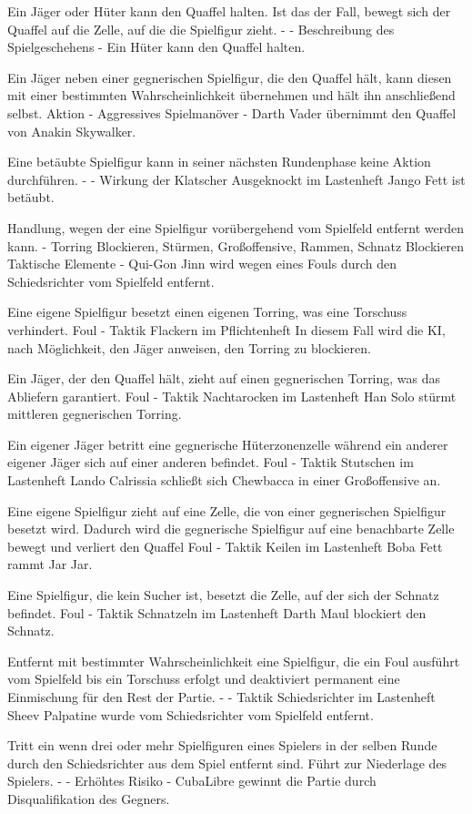 {Ein Jäger oder Hüter kann den Quaffel halten. Ist das der Fall, bewegt sich der Quaffel auf die Zelle, auf die die Spielfigur zieht.}
{-}
{-}
{Beschreibung des Spielgeschehens}
{-}
{Ein Hüter kann den Quaffel halten.}

{Ein Jäger neben einer gegnerischen Spielfigur, die den Quaffel hält, kann diesen mit einer bestimmten Wahrscheinlichkeit übernehmen und hält ihn anschließend selbst.}
{Aktion}
{-}
{Aggressives Spielmanöver}
{-}
{Darth Vader übernimmt den Quaffel von Anakin Skywalker.}

{Eine betäubte Spielfigur kann in seiner nächsten Rundenphase keine Aktion durchführen.}
{-}
{-}
{Wirkung der Klatscher}
{\glqq{}Ausgeknockt\grqq{}  im Lastenheft}
{Jango Fett ist betäubt.}

{Handlung, wegen der eine Spielfigur vorübergehend vom Spielfeld entfernt werden kann.}
{-}
{Torring Blockieren, Stürmen, Großoffensive, Rammen, Schnatz Blockieren}
{Taktische Elemente}
{-}
{Qui-Gon Jinn wird wegen eines Fouls durch den Schiedsrichter vom Spielfeld entfernt.}

{Eine eigene Spielfigur besetzt einen eigenen Torring, was eine Torschuss verhindert.}
{Foul}
{-}
{Taktik}
{\glqq{}Flackern\grqq{}  im Pflichtenheft}
{In diesem Fall wird die KI, nach Möglichkeit, den Jäger anweisen, den Torring zu blockieren.}

{Ein Jäger, der den Quaffel hält, zieht auf einen gegnerischen Torring, was das Abliefern garantiert.}
{Foul}
{-}
{Taktik}
{\glqq{}Nachtarocken\grqq{}  im Lastenheft}
{Han Solo stürmt mittleren gegnerischen Torring.}

{Ein eigener Jäger betritt eine gegnerische Hüterzonenzelle während ein anderer eigener Jäger sich auf einer anderen befindet.}
{Foul}
{-}
{Taktik}
{\glqq{}Stutschen\grqq{}  im Lastenheft}
{Lando Calrissia schließt sich Chewbacca in einer Großoffensive an.}

{Eine eigene Spielfigur zieht auf eine Zelle, die von einer gegnerischen Spielfigur besetzt wird. Dadurch wird die gegnerische Spielfigur auf eine benachbarte Zelle bewegt und verliert den Quaffel}
{Foul}
{-}
{Taktik}
{\glqq{}Keilen\grqq{}  im Lastenheft}
{Boba Fett rammt Jar Jar.}

{Eine Spielfigur, die kein Sucher ist, besetzt die Zelle, auf der sich der Schnatz befindet.}
{Foul}
{-}
{Taktik}
{\glqq{}Schnatzeln\grqq{}  im Lastenheft}
{Darth Maul blockiert den Schnatz.}

{Entfernt mit bestimmter Wahrscheinlichkeit eine Spielfigur, die ein Foul ausführt vom Spielfeld bis ein Torschuss erfolgt und deaktiviert permanent eine Einmischung für den Rest der Partie.}
{-}
{-}
{Taktik}
{\glqq{}Schiedsrichter\grqq{}  im Lastenheft}
{Sheev Palpatine wurde vom Schiedsrichter vom Spielfeld entfernt.}

{Tritt ein wenn drei oder mehr Spielfiguren eines Spielers in der selben Runde durch den Schiedsrichter aus dem Spiel entfernt sind. Führt zur Niederlage des Spielers.}
{-}
{-}
{Erhöhtes Risiko}
{-}
{CubaLibre gewinnt die Partie durch Disqualifikation des Gegners.}
